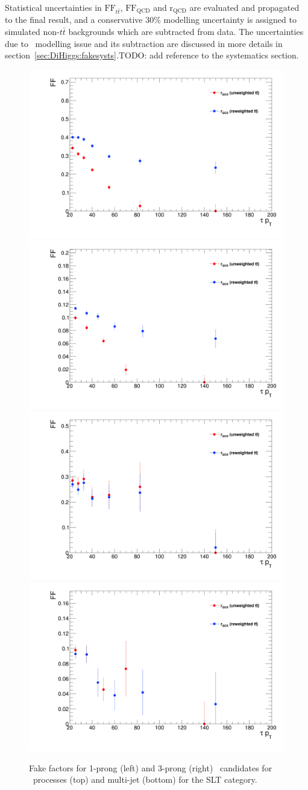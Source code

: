 Statistical uncertainties in $\text{FF}_{t\bar{t}}$, $\text{FF}_\text{QCD}$ and $\mathrm{r}_\text{QCD}$
are evaluated and propagated to the final result,
and a conservative 30\% modelling uncertainty is assigned to simulated non-$t\bar t$ backgrounds
which are subtracted from data.
The uncertainties due to \ttbar\ modelling issue and its subtraction are discussed in more details
in section~\ref{sec:DiHiggs:fakesysts}.TODO: add reference to the systematics section.

\begin{figure}[htbp]
\centering
\includegraphics[width=.4\textwidth]{DiHiggs/plots/FF_CRs/SLTttbarCR1p.png}
\includegraphics[width=.4\textwidth]{DiHiggs/plots/FF_CRs/SLTttbarCR3p.png} \\
\includegraphics[width=.4\textwidth]{DiHiggs/plots/FF_CRs/SLTInvCR1p.png}
\includegraphics[width=.4\textwidth]{DiHiggs/plots/FF_CRs/SLTInvCR3p.png}\\
\caption{Fake factors for 1-prong (left) and 3-prong (right) \tauhad\ candidates for \ttbar\ processes (top) and multi-jet (bottom) for the \lephad SLT category.}
\label{fig:SLT_FF}
\end{figure}


